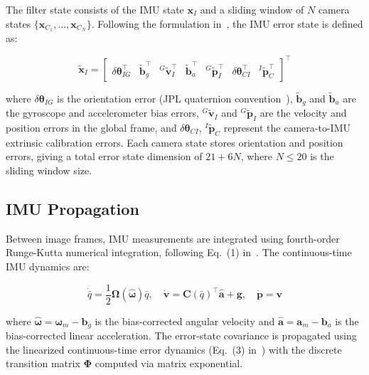 \documentclass[conference]{IEEEtran}
\begin{document}
The filter state consists of the IMU state $\mathbf{x}_I$ and a sliding window of $N$ camera states $\{\mathbf{x}_{C_1}, \ldots, \mathbf{x}_{C_N}\}$. Following the formulation in~\cite{mourikis2007}, the IMU error state is defined as:

\begin{equation}
\tilde{\mathbf{x}}_I = \begin{bmatrix} \delta\boldsymbol{\theta}_{IG}^\top & \tilde{\mathbf{b}}_g^\top & {}^G\tilde{\mathbf{v}}_I^\top & \tilde{\mathbf{b}}_a^\top & {}^G\tilde{\mathbf{p}}_I^\top & \delta\boldsymbol{\theta}_{CI}^\top & {}^I\tilde{\mathbf{p}}_C^\top \end{bmatrix}^\top
\end{equation}

\noindent where $\delta\boldsymbol{\theta}_{IG}$ is the orientation error (JPL quaternion convention~\cite{trawny2005}), $\tilde{\mathbf{b}}_g$ and $\tilde{\mathbf{b}}_a$ are the gyroscope and accelerometer bias errors, ${}^G\tilde{\mathbf{v}}_I$ and ${}^G\tilde{\mathbf{p}}_I$ are the velocity and position errors in the global frame, and $\delta\boldsymbol{\theta}_{CI}$, ${}^I\tilde{\mathbf{p}}_C$ represent the camera-to-IMU extrinsic calibration errors. Each camera state stores orientation and position errors, giving a total error state dimension of $21 + 6N$, where $N \leq 20$ is the sliding window size.

\subsection{IMU Propagation}

Between image frames, IMU measurements are integrated using fourth-order Runge-Kutta numerical integration, following Eq.~(1) in~\cite{mourikis2007}. The continuous-time IMU dynamics are:

\begin{equation}
\dot{\bar{q}} = \frac{1}{2} \boldsymbol{\Omega}(\hat{\boldsymbol{\omega}}) \bar{q}, \quad
\dot{\mathbf{v}} = \mathbf{C}(\bar{q})^\top \hat{\mathbf{a}} + \mathbf{g}, \quad
\dot{\mathbf{p}} = \mathbf{v}
\end{equation}

\noindent where $\hat{\boldsymbol{\omega}} = \boldsymbol{\omega}_m - \mathbf{b}_g$ is the bias-corrected angular velocity and $\hat{\mathbf{a}} = \mathbf{a}_m - \mathbf{b}_a$ is the bias-corrected linear acceleration. The error-state covariance is propagated using the linearized continuous-time error dynamics (Eq.~(3) in~\cite{mourikis2007}) with the discrete transition matrix $\boldsymbol{\Phi}$ computed via matrix exponential.
\end{document}

